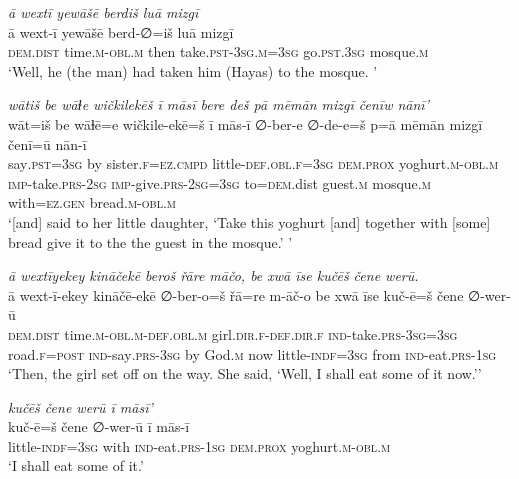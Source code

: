 \ea \label{ŽH.35}
\textit{ā wextī yewāšē berdiš luā mizgī} \\ 
\gll ā wext-ī yewāšē berd-∅=iš luā mizgī \\ 
 \textsc{dem.dist} time\textsc{.m}\textsc{-obl}\textsc{.m} then take\textsc{.pst}\textsc{-3sg}\textsc{.m}\textsc{=3sg} go\textsc{.pst}\textsc{.3sg} mosque\textsc{.m} \\ 
\glt `Well, he (the man) had taken him (Hayas) to the mosque. '
\z 
 
\ea \label{ŽH.40}
\textit{wātiš be wāɫe wičkilekēš ī māsī bere deš pā mēmān mizgī čenīw nānī’} \\ 
\gll wāt=iš be wāɫē=e wičkile-ekē=š ī mās-ī ∅-ber-e ∅-de-e=š p=ā mēmān mizgī čenī=ū nān-ī \\ 
 say\textsc{.pst}\textsc{=3sg} by sister\textsc{\textsc{.f}}\textsc{=ez}\textsc{.cmpd} little\textsc{-def}\textsc{.obl}\textsc{\textsc{.f}}\textsc{=3sg} \textsc{dem.prox} yoghurt\textsc{.m}\textsc{-obl}\textsc{.m} \textsc{imp-}take\textsc{.prs}-\textsc{2sg} \textsc{imp-}give\textsc{.prs}-\textsc{2sg}\textsc{=3sg} to\textsc{=dem}.dist guest\textsc{.m} mosque\textsc{.m} with\textsc{=ez}\textsc{.gen} bread\textsc{.m}\textsc{-obl}\textsc{.m} \\ 
\glt `[and] said to her little daughter, ‘Take this yoghurt [and] together with [some] bread give it to the the guest in the mosque.’ '
\z 
 
\ea \label{ŽH.41}
\textit{ā wextīyekey kināčekē beroš řāre māčo, be xwā īse kučēš čene werū.} \\ 
\gll ā wext-ī-ekey kināčē-ekē ∅-ber-o=š řā=re m-āč-o be xwā īse kuč-ē=š čene ∅-wer-ū \\ 
 \textsc{dem.dist} time\textsc{.m}\textsc{-obl}\textsc{.m}\textsc{-def}\textsc{.obl}\textsc{.m} girl\textsc{.dir}\textsc{\textsc{.f}}\textsc{-def}\textsc{.dir}\textsc{\textsc{.f}} \textsc{ind-}take\textsc{.prs}\textsc{-3sg}\textsc{=3sg} road\textsc{\textsc{.f}}\textsc{=\textsc{post}} \textsc{ind-}say\textsc{.prs}\textsc{-3sg} by God\textsc{.m} now little\textsc{-indf}\textsc{=3sg} from \textsc{ind-}eat\textsc{.prs}\textsc{-1sg} \\ 
\glt `Then, the girl set off on the way. She said, ‘Well, I shall eat some of it now.’'
\z 
 
\ea \label{ŽH.42}
\textit{kučēš čene werū ī māsī’} \\ 
\gll kuč-ē=š čene ∅-wer-ū ī mās-ī \\ 
 little\textsc{-indf}\textsc{=3sg} with \textsc{ind-}eat\textsc{.prs}\textsc{-1sg} \textsc{dem.prox} yoghurt\textsc{.m}\textsc{-obl}\textsc{.m} \\ 
\glt `I shall eat some of it.'
\z 
 
